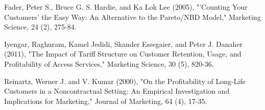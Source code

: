 Fader, Peter S., Bruce G. S. Hardie, and Ka Lok Lee (2005), "'Counting Your Customers' the Easy Way: An Alternative to the Pareto/NBD Model," Marketing Science, 24 (2), 275-84.

Iyengar, Raghuram, Kamel Jedidi, Skander Essegaier, and Peter J. Danaher (2011), "The Impact of Tariff Structure on Customer Retention, Usage, and Profitability of Access Services," Marketing Science, 30 (5), 820-36.

Reinartz, Werner J. and V. Kumar (2000), "On the Profitability of Long-Life Customers in a Noncontractual Setting: An Empirical Investigation and Implications for Marketing," Journal of Marketing, 64 (4), 17-35.



